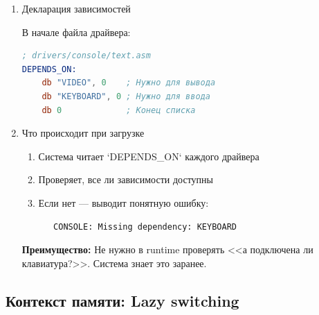 \documentclass[11pt,a4paper]{scrartcl}
\begin{document}
\begin{enumerate}
\item Декларация зависимостей
\label{sec:orgb168168}

В начале файла драйвера:

\begin{lstlisting}[language=asm,numbers=none]
; drivers/console/text.asm
DEPENDS_ON:
    db "VIDEO", 0    ; Нужно для вывода
    db "KEYBOARD", 0 ; Нужно для ввода
    db 0             ; Конец списка
\end{lstlisting}
\item Что происходит при загрузке
\label{sec:orgf3172a6}

\begin{enumerate}
\item Система читает `DEPENDS\_ON` каждого драйвера
\item Проверяет, все ли зависимости доступны
\item Если нет — выводит понятную ошибку:

\begin{verbatim}
   CONSOLE: Missing dependency: KEYBOARD
\end{verbatim}
\end{enumerate}

\textbf{Преимущество:} Не нужно в runtime проверять {}<<а подключена ли клавиатура?>>{}. Система знает это заранее.
\end{enumerate}
\subsection{Контекст памяти: Lazy switching}
\label{sec:orgb258a72}
\end{document}
